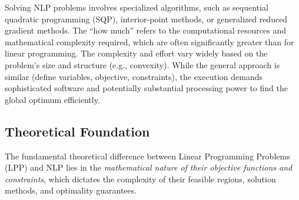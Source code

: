 \documentclass[
  letterpaper,
  DIV=11,
  numbers=noendperiod]{scrreprt}
\begin{document}
Solving NLP problems involves specialized algorithms, such as sequential
quadratic programming (SQP), interior-point methods, or generalized
reduced gradient methods. The ``how much'' refers to the computational
resources and mathematical complexity required, which are often
significantly greater than for linear programming. The complexity and
effort vary widely based on the problem's size and structure (e.g.,
convexity). While the general approach is similar (define variables,
objective, constraints), the execution demands sophisticated software
and potentially substantial processing power to find the global optimum
efficiently.

\subsection{Theoretical Foundation}\label{theoretical-foundation}

The fundamental theoretical difference between Linear Programming
Problems (LPP) and NLP lies in the \emph{mathematical nature of their
objective functions and constraints}, which dictates the complexity of
their feasible regions, solution methods, and optimality guarantees.
\end{document}
